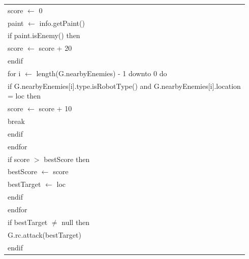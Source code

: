 \documentclass{article}
\newenvironment{pseudobox}
{
\centering
\begin{longtable}{|p{0.94\linewidth}|}
\hline
}
{
\\ \hline
\end{longtable}
\vspace{0.05cm}
}
\begin{document}
\begin{pseudobox}
\hspace*{2em} score $\leftarrow$ 0 \\
\hspace*{2em} paint $\leftarrow$ info.getPaint() \\

\hspace*{2em} if paint.isEnemy() then \\
\hspace*{3em} score $\leftarrow$ score + 20 \\
\hspace*{2em} endif \\

\hspace*{2em} for i $\leftarrow$ length(G.nearbyEnemies) - 1 downto 0 do \\
\hspace*{3em} if G.nearbyEnemies[i].type.isRobotType() and G.nearbyEnemies[i].location = loc then \\
\hspace*{4em} score $\leftarrow$ score + 10 \\
\hspace*{4em} break \\
\hspace*{3em} endif \\
\hspace*{2em} endfor \\

\hspace*{2em} if score $>$ bestScore then \\
\hspace*{3em} bestScore $\leftarrow$ score \\
\hspace*{3em} bestTarget $\leftarrow$ loc \\
\hspace*{2em} endif \\
\hspace*{1em} endfor \\

\hspace*{1em} if bestTarget $\neq$ null then \\
\hspace*{2em} G.rc.attack(bestTarget) \\
\hspace*{1em} endif
\end{pseudobox}
\end{document}
